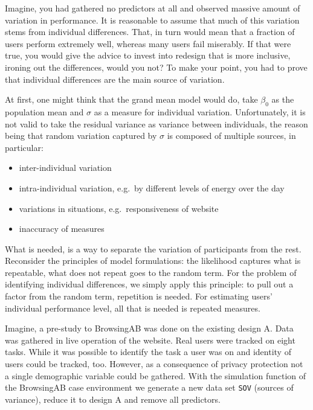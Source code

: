 \documentclass[]{svmono}
\providecommand{\tightlist}{%
  \setlength{\itemsep}{0pt}\setlength{\parskip}{0pt}}
\theoremstyle{definition}
\theoremstyle{definition}
\theoremstyle{definition}
\theoremstyle{remark}
\begin{document}
Imagine, you had gathered no predictors at all and observed massive
amount of variation in performance. It is reasonable to assume that much
of this variation stems from individual differences. That, in turn would
mean that a fraction of users perform extremely well, whereas many users
fail miserably. If that were true, you would give the advice to invest
into redesign that is more inclusive, ironing out the differences, would
you not? To make your point, you had to prove that individual
differences are the main source of variation.

At first, one might think that the grand mean model would do, take
\(\beta_0\) as the population mean and \(\sigma\) as a measure for
individual variation. Unfortunately, it is not valid to take the
residual variance as variance between individuals, the reason being that
random variation captured by \(\sigma\) is composed of multiple sources,
in particular:

\begin{itemize}
\tightlist
\item
  inter-individual variation
\item
  intra-individual variation, e.g.~by different levels of energy over
  the day
\item
  variations in situations, e.g.~responsiveness of website
\item
  inaccuracy of measures
\end{itemize}

What is needed, is a way to separate the variation of participants from
the rest. Reconsider the principles of model formulations: the
likelihood captures what is repeatable, what does not repeat goes to the
random term. For the problem of identifying individual differences, we
simply apply this principle: to pull out a factor from the random term,
repetition is needed. For estimating users' individual performance
level, all that is needed is repeated measures.

Imagine, a pre-study to BrowsingAB was done on the existing design A.
Data was gathered in live operation of the website. Real users were
tracked on eight tasks. While it was possible to identify the task a
user was on and identity of users could be tracked, too. However, as a
consequence of privacy protection not a single demographic variable
could be gathered. With the simulation function of the BrowsingAB case
environment we generate a new data set \texttt{SOV} (sources of
variance), reduce it to design A and remove all predictors.
\end{document}
